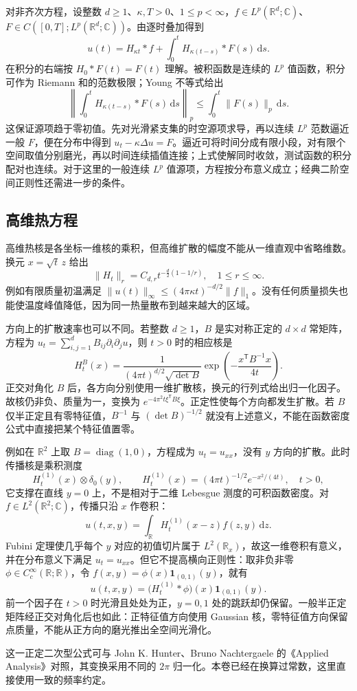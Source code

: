 对非齐次方程，设整数 \(d\geq1\)、\(\kappa,T>0\)、\(1\leq p<\infty\)，\(f\in L^p(\mathbb R^d;\mathbb C)\)、\(F\in C([0,T];L^p(\mathbb R^d;\mathbb C))\)。由逐时叠加得到
\begin{equation}\label{b2:eq:12-duhamel}
 u(t)=H_{\kappa t}*f+
 \int_0^tH_{\kappa(t-s)}*F(s)\,\mathrm{d}s.
\end{equation}
在积分的右端按 \(H_0*F(t)=F(t)\) 理解。被积函数是连续的 \(L^p\) 值函数，积分可作为 Riemann 和的范数极限；Young 不等式给出
\[
 \left\|\int_0^tH_{\kappa(t-s)}*F(s)\,\mathrm{d}s\right\|_p
 \leq\int_0^t\|F(s)\|_p\,\mathrm{d}s.
\]
这保证源项趋于零初值。先对光滑紧支集的时空源项求导，再以连续 \(L^p\) 范数逼近一般 \(F\)，便在分布中得到 \(u_t-\kappa\Delta u=F\)。逼近可将时间分成有限小段，对有限个空间取值分别磨光，再以时间连续插值连接；上式使解同时收敛，测试函数的积分配对也连续。对于这里的一般连续 \(L^p\) 值源项，方程按分布意义成立；经典二阶空间正则性还需进一步的条件。

\subsection{高维热方程}
\label{b2:subsec:120203}

高维热核是各坐标一维核的乘积，但高维扩散的幅度不能从一维直观中省略维数。换元 \(x=\sqrt t\,z\) 给出
\[
 \|H_t\|_r=C_{d,r}t^{-\frac d2(1-1/r)},
 \quad1\leq r\leq\infty.
\]
例如有限质量初温满足 \(\|u(t)\|_\infty\leq(4\pi\kappa t)^{-d/2}\|f\|_1\)。没有任何质量损失也能使温度峰值降低，因为同一热量散布到越来越大的区域。

\ProseParagraphBreak

方向上的扩散速率也可以不同。若整数 \(d\geq1\)，\(B\) 是实对称正定的 \(d\times d\) 常矩阵，方程为 \(u_t=\sum_{i,j=1}^dB_{ij}\partial_i\partial_ju\)，则 \(t>0\) 时的相应核是
\[
 H_t^B(x)=\dfrac1{(4\pi t)^{d/2}\sqrt{\det B}}
 \exp\left(-\dfrac{x^{\mathsf T}B^{-1}x}{4t}\right).
\]
正交对角化 \(B\) 后，各方向分别使用一维扩散核，换元的行列式给出归一化因子。故核仍非负、质量为一，变换为 \(e^{-4\pi^2t\xi^{\mathsf T}B\xi}\)。正定性使每个方向都发生扩散。若 \(B\) 仅半正定且有零特征值，\(B^{-1}\) 与 \((\det B)^{-1/2}\) 就没有上述意义，不能在函数密度公式中直接把某个特征值置零。

\ProseParagraphBreak

例如在 \(\mathbb R^2\) 上取 \(B=\operatorname{diag}(1,0)\)，方程成为 \(u_t=u_{xx}\)，没有 \(y\) 方向的扩散。此时传播核是乘积测度
\[
 H_t^{(1)}(x)\otimes\delta_0(y),\qquad
 H_t^{(1)}(x)=(4\pi t)^{-1/2}e^{-x^2/(4t)},\quad t>0,
\]
它支撑在直线 \(y=0\) 上，不是相对于二维 Lebesgue 测度的可积函数密度。对 \(f\in L^2(\mathbb R^2;\mathbb C)\)，传播只沿 \(x\) 作卷积：
\[
 u(t,x,y)=\int_{\mathbb R}H_t^{(1)}(x-z)f(z,y)\,\mathrm{d}z.
\]
Fubini 定理使几乎每个 \(y\) 对应的初值切片属于 \(L^2(\mathbb R_x)\)，故这一维卷积有意义，并在分布意义下满足 \(u_t=u_{xx}\)。但它不提高横向正则性：取非负非零 \(\phi\in C_c^\infty(\mathbb R;\mathbb R)\)，令 \(f(x,y)=\phi(x)\mathbf1_{(0,1)}(y)\)，就有
\[
 u(t,x,y)=\bigl(H_t^{(1)}*\phi\bigr)(x)\mathbf1_{(0,1)}(y).
\]
前一个因子在 \(t>0\) 时光滑且处处为正，\(y=0,1\) 处的跳跃却仍保留。一般半正定矩阵经正交对角化后也如此：正特征值方向使用 Gaussian 核，零特征值方向保留点质量，不能从正方向的磨光推出全空间光滑化。

\ProseParagraphBreak

这一正定二次型公式可与 John K. Hunter、Bruno Nachtergaele 的《Applied Analysis》\cite[pp. 303--304]{Hunter2001Applied}对照，其变换采用不同的 \(2\pi\) 归一化。本卷已经在换算过常数，这里直接使用一致的频率约定。
